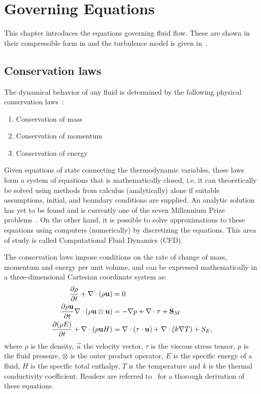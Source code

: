 \chapter{Governing Equations}
\label{chap:governing}
This chapter introduces the  equations governing fluid flow.
These are shown in their compressible form in  and
the turbulence model is given in~.
\section{Conservation laws}
\label{sec:ns}
The dynamical behavior of any fluid is determined by the following physical conservation laws~\cite{blazek2015computational}:
\begin{enumerate}
    \item Conservation of mass
    \item Conservation of momentum
    \item Conservation of energy
\end{enumerate}
Given equations of state connecting the thermodynamic variables, these laws form a system of equations that is mathematically closed, i.e. it can theoretically be solved using methods from calculus (analytically) alone if suitable assumptions, initial, and boundary conditions are supplied. An analytic solution has yet to be found and is currently one of the seven Millennium Prize problems~\cite{carlson2006millennium}. On the other hand, it is possible to solve approximations to these equations using computers (numerically) by discretizing the equations. This area of study is called Computational Fluid Dynamics (CFD).

The conservation laws impose conditions on the rate of change of mass, momentum and energy per unit volume, and can be expressed mathematically in a three-dimensional Cartesian coordinate system as:
\begin{align}
     \frac{\partial \rho}{\partial t}  + \nabla \cdot
        (\rho\mathbf{u}) &= 0 \label{eq:mass}
    \\
     \frac{\partial \rho\mathbf{u}}{\partial t}  \nabla\cdot(\rho\mathbf{u}\otimes\mathbf{u}) &= -\nabla p
     + \nabla \cdot \tau
     + \mathbf{S}_{M}
     \label{eq:mom}
     \\
     \frac{\partial (\rho E)}{\partial t}  + \nabla\cdot(\rho\mathbf{u}H) &=
      \nabla\cdot(\tau\cdot\mathbf{u}) + \nabla\cdot(k\nabla T)
         + S_E
     \label{eq:energy},
\end{align}
where $\rho$ is the density, $\vec{u}$ the velocity vector, $\tau$ is the viscous stress tensor, $p$ is the fluid pressure, $\otimes$ is the outer product operator, $E$ is the specific energy of a fluid, $H$ is the specific total enthalpy, $T$ is the temperature and $k$ is the thermal conductivity coefficient. Readers are referred to~\cite{munson2012fundamentals} for a thorough derivation of these equations.

